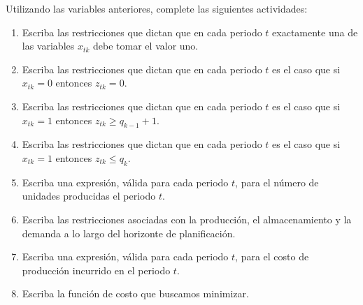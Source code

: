 \documentclass[ a4paper, twoside, 11pt]{article}
\begin{document}
\begin{problem}
Utilizando las variables anteriores, complete las siguientes actividades: 
\begin{enumerate}[label=\alph*)]
\item Escriba las restricciones que dictan que en cada periodo $t$ exactamente una de las variables $x_{tk}$ debe tomar el valor uno. 
\item Escriba las restricciones que dictan que en cada periodo $t$ es el caso que si $x_{tk} = 0$ entonces $z_{tk} = 0$. 
\item Escriba las restricciones que dictan que en cada periodo $t$ es el caso que si $x_{tk} = 1$ entonces $z_{tk} \geq q_{k-1} + 1$. 
\item Escriba las restricciones que dictan que en cada periodo $t$ es el caso que si $x_{tk} = 1$ entonces $z_{tk} \leq q_{k}$. 
\item Escriba una expresi\'on, v\'alida para cada periodo $t$, para el n\'umero de unidades producidas el periodo $t$. 
\item Escriba las restricciones asociadas con la producci\'on, el almacenamiento y la demanda a lo largo del horizonte de planificaci\'on. 
\item Escriba una expresi\'on, v\'alida para cada periodo $t$, para el costo de producci\'on incurrido en el periodo $t$. 
\item Escriba la funci\'on de costo que buscamos minimizar. 
\end{enumerate}
\QED

\end{problem}
\fullskip
\end{document}
